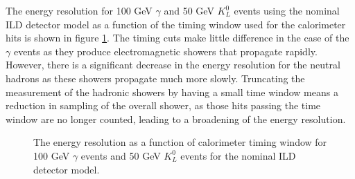 The energy resolution for 100 GeV $\gamma$ and 50 GeV $K^{0}_{L}$ events using the nominal ILD detector model as a function of the timing window used for the calorimeter hits is shown in figure \ref{fig:ertimingcuts}.  The timing cuts make little difference in the case of the $\gamma$ events as they produce electromagnetic showers that propagate rapidly.  However, there is a significant decrease in the energy resolution for the neutral hadrons as these showers propagate much more slowly.  Truncating the measurement of the hadronic showers by having a small time window means a reduction in sampling of the overall shower, as those hits passing the time window are no longer counted, leading to a broadening of the energy resolution.  

\begin{figure}
\caption[The energy resolution as a function of calorimeter timing window for \protect{} 100 GeV $\gamma$ events and \protect{} 50 GeV $K^{0}_{L}$ events for the nominal ILD detector model.]{The energy resolution as a function of calorimeter timing window for \protect{} 100 GeV $\gamma$ events and \protect{} 50 GeV $K^{0}_{L}$ events for the nominal ILD detector model.}
\label{fig:ertimingcuts}
\end{figure}

